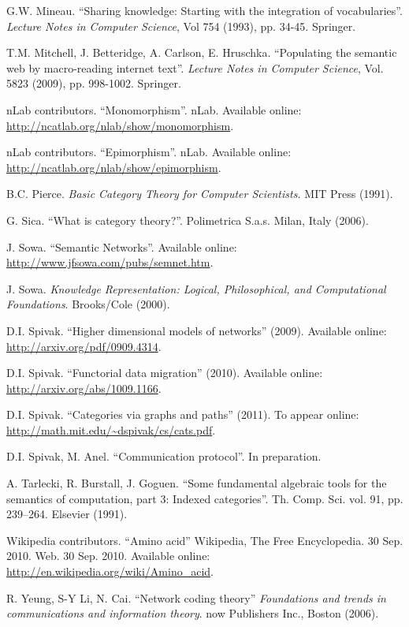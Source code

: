 \documentclass{amsart}
\theoremstyle{remark}
\theoremstyle{definition}
\begin{document}
\begin{thebibliography}{JTT}
 G.W. Mineau. 
``Sharing knowledge: Starting with the integration of vocabularies''. 
{\em Lecture Notes in Computer Science}, Vol 754 (1993), pp. 34-45. Springer.

 T.M. Mitchell, J. Betteridge, A. Carlson, E. Hruschka. 
``Populating the semantic web by macro-reading internet text''. 
{\em Lecture Notes in Computer Science}, Vol. 5823 (2009), pp. 998-1002. Springer.


  nLab contributors. 
``Monomorphism''. nLab.  
Available online: \url{http://ncatlab.org/nlab/show/monomorphism}.

 nLab contributors. 
``Epimorphism''. nLab. 
Available online: \url{http://ncatlab.org/nlab/show/epimorphism}.

 B.C. Pierce. 
{\em Basic Category Theory for Computer Scientists.} 
MIT Press (1991).

 G. Sica. 
``What is category theory?''. 
Polimetrica S.a.s. Milan, Italy (2006).

 J. Sowa. 
``Semantic Networks''. 
Available online: \url{http://www.jfsowa.com/pubs/semnet.htm}.

 J. Sowa. 
{\em Knowledge Representation: Logical, Philosophical, and Computational Foundations}. 
Brooks/Cole (2000). 


 D.I. Spivak. 
``Higher dimensional models of networks'' (2009). 
Available online: \url{http://arxiv.org/pdf/0909.4314}.

 D.I. Spivak. 
``Functorial data migration'' (2010). 
Available online: \url{http://arxiv.org/abs/1009.1166}.

 D.I. Spivak. 
``Categories via graphs and paths'' (2011).  
To appear online: \url{http://math.mit.edu/~dspivak/cs/cats.pdf}.

 D.I. Spivak, M. Anel. 
``Communication protocol''. 
In preparation.

 A. Tarlecki, R. Burstall, J. Goguen. 
``Some fundamental algebraic tools for the semantics of computation, part 3: Indexed categories''. 
Th. Comp. Sci. vol. 91, pp. 239--264. Elsevier (1991). 

Wikipedia contributors. 
``Amino acid'' 
Wikipedia, The Free Encyclopedia. 30 Sep. 2010. Web. 30 Sep. 2010. 
Available online: \url{http://en.wikipedia.org/wiki/Amino_acid}.

 R. Yeung, S-Y Li, N. Cai. 
``Network coding theory'' 
{\em Foundations and trends in communications and information theory}. 
now Publishers Inc., Boston (2006).

\end{thebibliography}
\end{document}
